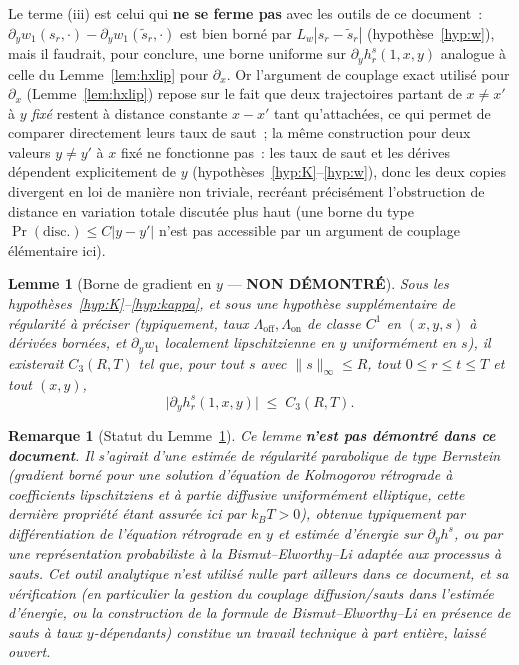 \documentclass[11pt,a4paper]{article}
\newcommand{\Lon}{\Lambda_{\mathrm{on}}}
\newcommand{\Loff}{\Lambda_{\mathrm{off}}}
\theoremstyle{plain}
\newtheorem*{remark*}{Remarque}
\newtheorem{lem}[thm]{Lemme}
\theoremstyle{definition}
\begin{document}
\begin{itemize}
Le terme (iii) est celui qui \textbf{ne se ferme pas} avec les outils de ce document~: $\partial_yw_1(s_r,\cdot)-\partial_yw_1(\tilde s_r,\cdot)$ est bien born\'e par $L_w|s_r-\tilde s_r|$ (hypoth\`ese~\ref{hyp:w}), mais il faudrait, pour conclure, une borne uniforme sur $\partial_yh^s_r(1,x,y)$ analogue \`a celle du Lemme~\ref{lem:hxlip} pour $\partial_x$. Or l'argument de couplage exact utilis\'e pour $\partial_x$ (Lemme~\ref{lem:hxlip}) repose sur le fait que deux trajectoires partant de $x\ne x'$ \`a $y$ \emph{fix\'e} restent \`a distance constante $x-x'$ tant qu'attach\'ees, ce qui permet de comparer directement leurs taux de saut~; la m\^eme construction pour deux valeurs $y\ne y'$ \`a $x$ fix\'e ne fonctionne pas~: les taux de saut et les d\'erives d\'ependent explicitement de $y$ (hypoth\`eses~\ref{hyp:K}--\ref{hyp:w}), donc les deux copies divergent en loi de mani\`ere non triviale, recr\'eant pr\'ecis\'ement l'obstruction de distance en variation totale discut\'ee plus haut (une borne du type $\Pr(\text{disc.})\le C|y-y'|$ n'est pas accessible par un argument de couplage \'el\'ementaire ici).
\end{itemize}

\begin{lem}[Borne de gradient en $y$ --- \textbf{NON D\'EMONTR\'E}]
\label{lem:opengrad}
Sous les hypoth\`eses~\ref{hyp:K}--\ref{hyp:kappa}, et sous une hypoth\`ese suppl\'ementaire de r\'egularit\'e \`a pr\'eciser (typiquement, taux $\Loff,\Lon$ de classe $C^1$ en $(x,y,s)$ \`a d\'eriv\'ees born\'ees, et $\partial_yw_1$ localement lipschitzienne en $y$ uniform\'ement en $s$), il existerait $C_3(R,T)$ tel que, pour tout $s$ avec $\|s\|_\infty\le R$, tout $0\le r\le t\le T$ et tout $(x,y)$,
\[
\big|\partial_yh^s_r(1,x,y)\big| \;\le\; C_3(R,T).
\]
\end{lem}

\begin{remark*}[Statut du Lemme~\ref{lem:opengrad}]
Ce lemme \textbf{n'est pas d\'emontr\'e dans ce document}. Il s'agirait d'une estim\'ee de r\'egularit\'e parabolique de type Bernstein (gradient born\'e pour une solution d'\'equation de Kolmogorov r\'etrograde \`a coefficients lipschitziens et \`a partie diffusive uniform\'ement elliptique, cette derni\`ere propri\'et\'e \'etant assur\'ee ici par $k_BT>0$), obtenue typiquement par diff\'erentiation de l'\'equation r\'etrograde en $y$ et estim\'ee d'\'energie sur $\partial_yh^s$, ou par une repr\'esentation probabiliste \`a la Bismut--Elworthy--Li adapt\'ee aux processus \`a sauts. Cet outil analytique n'est utilis\'e nulle part ailleurs dans ce document, et sa v\'erification (en particulier la gestion du couplage diffusion/sauts dans l'estim\'ee d'\'energie, ou la construction de la formule de Bismut--Elworthy--Li en pr\'esence de sauts \`a taux $y$-d\'ependants) constitue un travail technique \`a part enti\`ere, laiss\'e ouvert.
\end{remark*}
\end{document}
